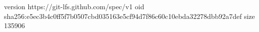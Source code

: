 version https://git-lfs.github.com/spec/v1
oid sha256:e5ec3b4c0ff5f7b0507cbd035163e5cf94d7f86c60c10ebda32278dbb92a7def
size 135906
